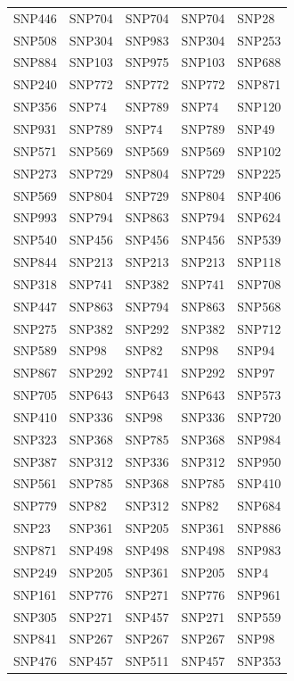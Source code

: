 \begin{table}[ht]
\begin{tabular}{lllll}
  SNP446 & SNP704 & SNP704 & SNP704 & SNP28 \\ 
  SNP508 & SNP304 & SNP983 & SNP304 & SNP253 \\ 
  SNP884 & SNP103 & SNP975 & SNP103 & SNP688 \\ 
  SNP240 & SNP772 & SNP772 & SNP772 & SNP871 \\ 
  SNP356 & SNP74 & SNP789 & SNP74 & SNP120 \\ 
  SNP931 & SNP789 & SNP74 & SNP789 & SNP49 \\ 
  SNP571 & SNP569 & SNP569 & SNP569 & SNP102 \\ 
  SNP273 & SNP729 & SNP804 & SNP729 & SNP225 \\ 
  SNP569 & SNP804 & SNP729 & SNP804 & SNP406 \\ 
  SNP993 & SNP794 & SNP863 & SNP794 & SNP624 \\ 
  SNP540 & SNP456 & SNP456 & SNP456 & SNP539 \\ 
  SNP844 & SNP213 & SNP213 & SNP213 & SNP118 \\ 
  SNP318 & SNP741 & SNP382 & SNP741 & SNP708 \\ 
  SNP447 & SNP863 & SNP794 & SNP863 & SNP568 \\ 
  SNP275 & SNP382 & SNP292 & SNP382 & SNP712 \\ 
  SNP589 & SNP98 & SNP82 & SNP98 & SNP94 \\ 
  SNP867 & SNP292 & SNP741 & SNP292 & SNP97 \\ 
  SNP705 & SNP643 & SNP643 & SNP643 & SNP573 \\ 
  SNP410 & SNP336 & SNP98 & SNP336 & SNP720 \\ 
  SNP323 & SNP368 & SNP785 & SNP368 & SNP984 \\ 
  SNP387 & SNP312 & SNP336 & SNP312 & SNP950 \\ 
  SNP561 & SNP785 & SNP368 & SNP785 & SNP410 \\ 
  SNP779 & SNP82 & SNP312 & SNP82 & SNP684 \\ 
  SNP23 & SNP361 & SNP205 & SNP361 & SNP886 \\ 
  SNP871 & SNP498 & SNP498 & SNP498 & SNP983 \\ 
  SNP249 & SNP205 & SNP361 & SNP205 & SNP4 \\ 
  SNP161 & SNP776 & SNP271 & SNP776 & SNP961 \\ 
  SNP305 & SNP271 & SNP457 & SNP271 & SNP559 \\ 
  SNP841 & SNP267 & SNP267 & SNP267 & SNP98 \\ 
  SNP476 & SNP457 & SNP511 & SNP457 & SNP353 \\ 

\end{tabular}
\end{table}
